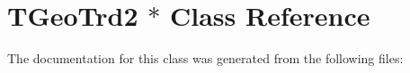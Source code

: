 \hypertarget{class_t_geo_trd2_01_5}{
\section{TGeoTrd2 $\ast$ Class Reference}
\label{class_t_geo_trd2_01_5}
}


The documentation for this class was generated from the following files: